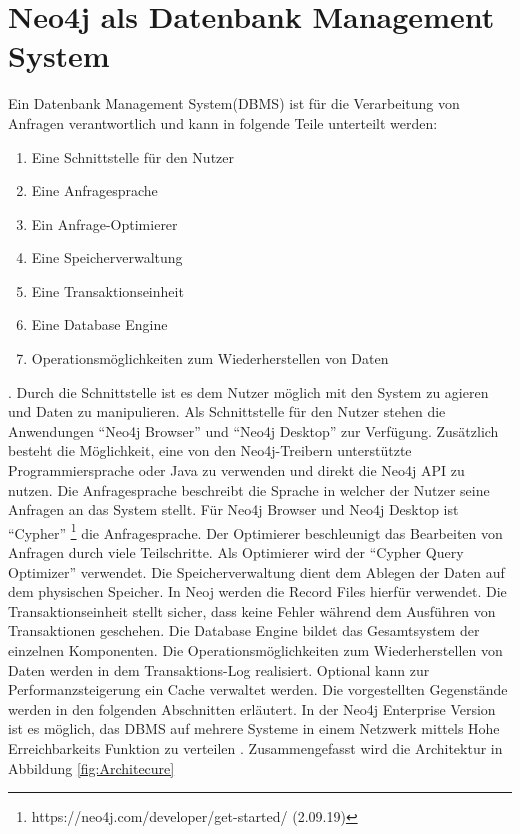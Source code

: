 \section{Neo4j als Datenbank Management System}
Ein Datenbank Management System(DBMS) ist für die Verarbeitung von Anfragen verantwortlich und kann in folgende Teile unterteilt werden:
\begin{enumerate}
\item Eine Schnittstelle für den Nutzer
\item Eine Anfragesprache
\item Ein Anfrage-Optimierer
\item Eine Speicherverwaltung
\item Eine Transaktionseinheit
\item Eine Database Engine
\item Operationsmöglichkeiten zum Wiederherstellen von Daten
\end{enumerate}
  \parencite{angles2012comparison}. Durch die Schnittstelle ist es dem Nutzer möglich mit den System zu agieren und Daten zu manipulieren. Als Schnittstelle für den Nutzer stehen die Anwendungen “Neo4j Browser” und “Neo4j Desktop” zur Verfügung. Zusätzlich besteht die Möglichkeit, eine von den Neo4j-Treibern unterstützte Programmiersprache  oder  Java zu verwenden und direkt die Neo4j API zu nutzen. Die Anfragesprache  beschreibt die Sprache in welcher der Nutzer seine Anfragen an das System stellt. Für Neo4j Browser und Neo4j Desktop ist “Cypher” \footnote{https://neo4j.com/developer/get-started/ (2.09.19)} die Anfragesprache. Der Optimierer beschleunigt das Bearbeiten von Anfragen durch viele Teilschritte. Als Optimierer wird der “Cypher Query Optimizer” verwendet. Die Speicherverwaltung dient dem Ablegen der Daten auf dem physischen Speicher. In Neoj werden die Record Files hierfür verwendet. Die Transaktionseinheit stellt sicher, dass keine Fehler während dem Ausführen von Transaktionen geschehen. Die Database Engine bildet das Gesamtsystem der einzelnen Komponenten. Die Operationsmöglichkeiten zum Wiederherstellen von Daten werden in dem Transaktions-Log realisiert. Optional kann zur  Performanzsteigerung ein Cache verwaltet werden. Die vorgestellten Gegenstände werden in den folgenden Abschnitten erläutert. In der Neo4j Enterprise Version ist es möglich, das DBMS auf mehrere Systeme in einem Netzwerk mittels Hohe Erreichbarkeits Funktion zu verteilen \parencite{vukotic2015neo4j}. Zusammengefasst wird die Architektur in Abbildung \ref{fig:Architecure}

